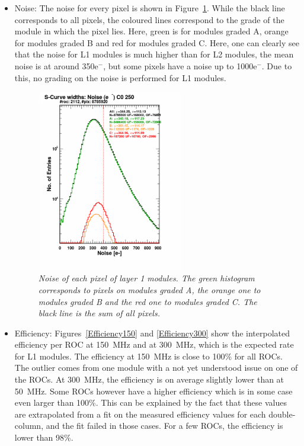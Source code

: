 \documentclass[a4paper,12pt,twoside]{article}
\begin{document}
\begin{itemize}
\item Noise:
The noise for every pixel is shown in Figure~\ref{L1Noise}. While the black line corresponds to all pixels, the coloured lines correspond to the grade of the module in which the pixel lies. Here, green is for modules graded A, orange for modules graded B and red for modules graded C. Here, one can clearly see that the noise for L1 modules is much higher than for L2 modules, the mean noise is at around 350e$^-$, but some pixels have a noise up to 1000e$^-$. Due to this, no grading on the noise is performed for L1 modules.

\begin{figure} [h!] \centering 
\includegraphics[width=0.6\textwidth, angle=0] {./Figures/L1Noise.pdf}
\caption{\em  \label{L1Noise}
Noise of each pixel of layer 1 modules. The green histogram corresponds to pixels on modules graded A, the orange one to modules graded B and the red one to modules graded C. The black line is the sum of all pixels.}
\end{figure}

\item Efficiency: 
Figures~\ref{Efficiency150} and \ref{Efficiency300} show the interpolated efficiency per ROC at \SI{150}{\mega\hertz} and at \SI{300}{\mega\hertz}, which is the expected rate for L1 modules. The efficiency at \SI{150}{\mega\hertz} is close to 100\% for all ROCs. The outlier comes from one module with a not yet understood issue on one of the ROCs. At \SI{300}{\mega\hertz}, the efficiency is on average slightly lower than at \SI{50}{\mega\hertz}. Some ROCs however have a higher efficiency which is in some case even larger than 100\%. This can be explained by the fact that these values are extrapolated from a fit on the measured efficiency values for each double-column, and the fit failed in those cases. For a few ROCs, the efficiency is lower than 98\%. 


\end{itemize}
\end{document}
